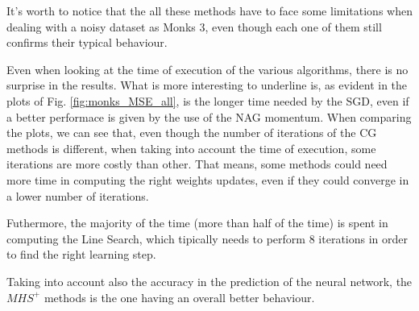             It's worth to notice that the all these methods have to face some limitations when dealing with a noisy dataset as Monks 3, even though each one of them still confirms their typical behaviour.
            
            Even when looking at the time of execution of the various algorithms, there is no surprise in the results. What is more interesting to underline is, as evident in the plots of Fig. \ref{fig:monks_MSE_all}, is the longer time needed by the SGD, even if a better performace is given by the use of the NAG momentum. 
            When comparing the plots, we can see that, even though the number of iterations of the CG methods is different, when taking into account the time of execution, some iterations are more costly than other. That means, some methods could need more time in computing the right weights updates, even if they could converge in a lower number of iterations. 

            Futhermore, the majority of the time (more than half of the time) is spent in computing the Line Search, which tipically needs to perform 8 iterations in order to find the right learning step.

            Taking into account also the accuracy in the prediction of the neural network, the $MHS^+$ methods is the one having an overall better behaviour.

